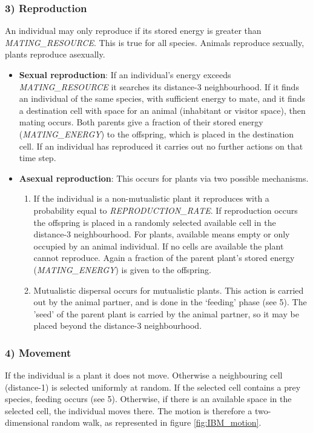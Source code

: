 \subsubsection*{3) Reproduction}
An individual may only reproduce if its stored energy is greater than \emph{MATING\_RESOURCE}. This is true for all species. Animals reproduce sexually, plants reproduce asexually.
\begin{itemize}
	\item \textbf{Sexual reproduction}: If an individual's energy exceeds \emph{MATING\_RESOURCE} it searches its distance-3 neighbourhood. If it finds an individual of the same species, with sufficient energy to mate, and it finds a destination cell with space for an animal (inhabitant or visitor space), then mating occurs. Both parents give a fraction of their stored energy (\emph{MATING\_ENERGY}) to the offspring, which is placed in the destination cell. If an individual has reproduced it carries out no further actions on that time step.
	\item \textbf{Asexual reproduction}: This occurs for plants via two possible mechanisms. 
	\begin{enumerate}
	\item If the individual is a non-mutualistic plant it reproduces with a probability equal to \emph{REPRODUCTION\_RATE}. If reproduction occurs the offspring is placed in a randomly selected available cell in the distance-3 neighbourhood. For plants, available means empty or only occupied by an animal individual. If no cells are available the plant cannot reproduce. Again a fraction of the parent plant's stored energy (\emph{MATING\_ENERGY}) is given to the offspring.
	\item Mutualistic dispersal occurs for mutualistic plants. This action is carried out by the animal partner, and is done in the `feeding' phase (see 5). The 'seed' of the parent plant is carried by the animal partner, so it may be placed beyond the distance-3 neighbourhood. 
    \end{enumerate}	 
\end{itemize}

\subsubsection*{4) Movement}
If the individual is a plant it does not move. Otherwise a neighbouring cell (distance-1) is selected uniformly at random. If the selected cell contains a prey species, feeding occurs (see 5). Otherwise, if there is an available space in the selected cell, the individual moves there. The motion is therefore a two-dimensional random walk, as represented in figure \ref{fig:IBM_motion}.
